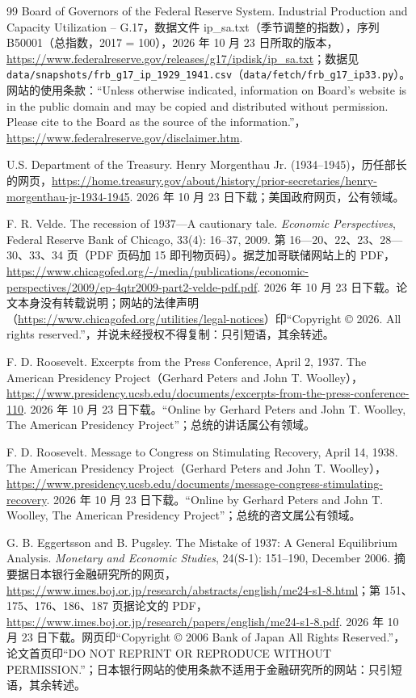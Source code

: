 \begin{thebibliography}{99}
 Board of Governors of the Federal Reserve System. Industrial Production and Capacity Utilization -- G.17，数据文件 ip\_sa.txt（季节调整的指数），序列 B50001（总指数，2017 = 100），2026 年 10 月 23 日所取的版本，\url{https://www.federalreserve.gov/releases/g17/ipdisk/ip_sa.txt}；数据见 \texttt{data/snapshots/frb\_g17\_ip\_1929\_1941.csv}（\texttt{data/fetch/frb\_g17\_ip33.py}）。网站的使用条款：“Unless otherwise indicated, information on Board's website is in the public domain and may be copied and distributed without permission. Please cite to the Board as the source of the information.”，\url{https://www.federalreserve.gov/disclaimer.htm}.

 U.S. Department of the Treasury. Henry Morgenthau Jr. (1934--1945)，历任部长的网页，\url{https://home.treasury.gov/about/history/prior-secretaries/henry-morgenthau-jr-1934-1945}. 2026 年 10 月 23 日下载；美国政府网页，公有领域。

 F. R. Velde. The recession of 1937---A cautionary tale. \emph{Economic Perspectives}, Federal Reserve Bank of Chicago, 33(4): 16--37, 2009. 第 16—20、22、23、28—30、33、34 页（PDF 页码加 15 即刊物页码）。据芝加哥联储网站上的 PDF，\url{https://www.chicagofed.org/-/media/publications/economic-perspectives/2009/ep-4qtr2009-part2-velde-pdf.pdf}. 2026 年 10 月 23 日下载。论文本身没有转载说明；网站的法律声明（\url{https://www.chicagofed.org/utilities/legal-notices}）印“Copyright © 2026. All rights reserved.”，并说未经授权不得复制：只引短语，其余转述。

 F. D. Roosevelt. Excerpts from the Press Conference, April 2, 1937. The American Presidency Project（Gerhard Peters and John T. Woolley），\url{https://www.presidency.ucsb.edu/documents/excerpts-from-the-press-conference-110}. 2026 年 10 月 23 日下载。“Online by Gerhard Peters and John T. Woolley, The American Presidency Project”；总统的讲话属公有领域。

 F. D. Roosevelt. Message to Congress on Stimulating Recovery, April 14, 1938. The American Presidency Project（Gerhard Peters and John T. Woolley），\url{https://www.presidency.ucsb.edu/documents/message-congress-stimulating-recovery}. 2026 年 10 月 23 日下载。“Online by Gerhard Peters and John T. Woolley, The American Presidency Project”；总统的咨文属公有领域。

 G. B. Eggertsson and B. Pugsley. The Mistake of 1937: A General Equilibrium Analysis. \emph{Monetary and Economic Studies}, 24(S-1): 151--190, December 2006. 摘要据日本银行金融研究所的网页，\url{https://www.imes.boj.or.jp/research/abstracts/english/me24-s1-8.html}；第 151、175、176、186、187 页据论文的 PDF，\url{https://www.imes.boj.or.jp/research/papers/english/me24-s1-8.pdf}. 2026 年 10 月 23 日下载。网页印“Copyright © 2006 Bank of Japan All Rights Reserved.”，论文首页印“DO NOT REPRINT OR REPRODUCE WITHOUT PERMISSION.”；日本银行网站的使用条款不适用于金融研究所的网站：只引短语，其余转述。


\end{thebibliography}
